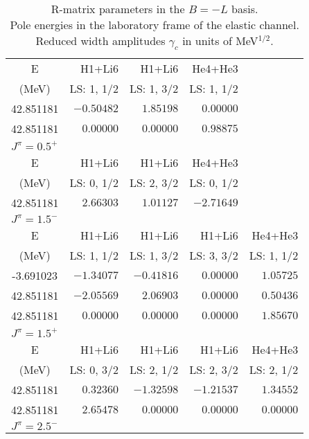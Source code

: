 \documentclass[aps]{revtex4}
\begin{document}
\squeezetable 
\begin{longtable}{c|rrrr} 
\caption{ 
R-matrix parameters  in the $B = -L$ basis. \\ Pole energies in the laboratory frame of the elastic channel. \\ Reduced width amplitudes $\gamma_c$ in units of MeV$^{1/2}$. 
}\\[1pt] 
\hline\hline 
\endhead 
\hline 
\endfoot 
\hline\multicolumn{5}{l}{\em $J^\pi = 0.5^-$ \rule{0pt}{7pt}}\\[1pt]\hline
E& H1+Li6 & H1+Li6 & He4+He3 \\ 
(MeV)& LS: 1, 1/2 & LS: 1, 3/2 & LS: 1, 1/2 \\ 
42.851181 & $-0.50482$ & $1.85198$ & $0.00000$ \rule{0pt}{8pt}\\[1pt]
42.851181 & $0.00000$ & $0.00000$ & $0.98875$ \rule{0pt}{8pt}\\[1pt]
\hline\multicolumn{5}{l}{\em $J^\pi = 0.5^+$ \rule{0pt}{7pt}}\\[1pt]\hline
E& H1+Li6 & H1+Li6 & He4+He3 \\ 
(MeV)& LS: 0, 1/2 & LS: 2, 3/2 & LS: 0, 1/2 \\ 
42.851181 & $2.66303$ & $1.01127$ & $-2.71649$ \rule{0pt}{8pt}\\[1pt]
\hline\multicolumn{5}{l}{\em $J^\pi = 1.5^-$ \rule{0pt}{7pt}}\\[1pt]\hline
E& H1+Li6 & H1+Li6 & H1+Li6 & He4+He3 \\ 
(MeV)& LS: 1, 1/2 & LS: 1, 3/2 & LS: 3, 3/2 & LS: 1, 1/2 \\ 
-3.691023 & $-1.34077$ & $-0.41816$ & $0.00000$ & $1.05725$ \rule{0pt}{8pt}\\[1pt]
42.851181 & $-2.05569$ & $2.06903$ & $0.00000$ & $0.50436$ \rule{0pt}{8pt}\\[1pt]
42.851181 & $0.00000$ & $0.00000$ & $0.00000$ & $1.85670$ \rule{0pt}{8pt}\\[1pt]
\hline\multicolumn{5}{l}{\em $J^\pi = 1.5^+$ \rule{0pt}{7pt}}\\[1pt]\hline
E& H1+Li6 & H1+Li6 & H1+Li6 & He4+He3 \\ 
(MeV)& LS: 0, 3/2 & LS: 2, 1/2 & LS: 2, 3/2 & LS: 2, 1/2 \\ 
42.851181 & $0.32360$ & $-1.32598$ & $-1.21537$ & $1.34552$ \rule{0pt}{8pt}\\[1pt]
42.851181 & $2.65478$ & $0.00000$ & $0.00000$ & $0.00000$ \rule{0pt}{8pt}\\[1pt]
\hline\multicolumn{5}{l}{\em $J^\pi = 2.5^-$ \rule{0pt}{7pt}}\\[1pt]\hline

\end{longtable}
\end{document}
